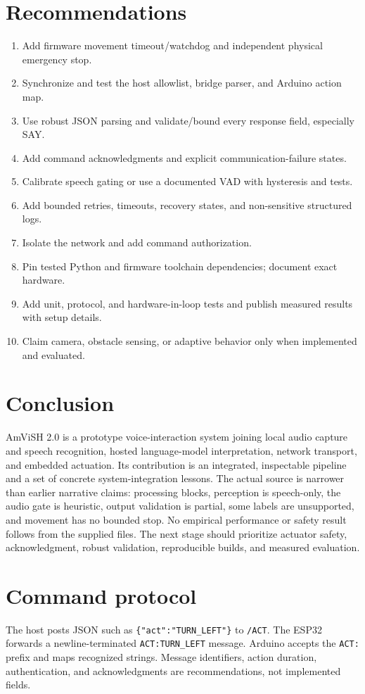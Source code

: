 \documentclass[12pt,a4paper]{report}
\begin{document}
\chapter{Recommendations}
\begin{enumerate}[leftmargin=*]\item Add firmware movement timeout/watchdog and independent physical emergency stop.\item Synchronize and test the host allowlist, bridge parser, and Arduino action map.\item Use robust JSON parsing and validate/bound every response field, especially SAY.\item Add command acknowledgments and explicit communication-failure states.\item Calibrate speech gating or use a documented VAD with hysteresis and tests.\item Add bounded retries, timeouts, recovery states, and non-sensitive structured logs.\item Isolate the network and add command authorization.\item Pin tested Python and firmware toolchain dependencies; document exact hardware.\item Add unit, protocol, and hardware-in-loop tests and publish measured results with setup details.\item Claim camera, obstacle sensing, or adaptive behavior only when implemented and evaluated.\end{enumerate}
\chapter{Conclusion}
AmViSH 2.0 is a prototype voice-interaction system joining local audio capture and speech recognition, hosted language-model interpretation, network transport, and embedded actuation. Its contribution is an integrated, inspectable pipeline and a set of concrete system-integration lessons. The actual source is narrower than earlier narrative claims: processing blocks, perception is speech-only, the audio gate is heuristic, output validation is partial, some labels are unsupported, and movement has no bounded stop. No empirical performance or safety result follows from the supplied files. The next stage should prioritize actuator safety, acknowledgment, robust validation, reproducible builds, and measured evaluation.
\appendix\chapter{Command protocol}
The host posts JSON such as \texttt{\{"act":"TURN\_LEFT"\}} to \texttt{/ACT}. The ESP32 forwards a newline-terminated \texttt{ACT:TURN\_LEFT} message. Arduino accepts the \texttt{ACT:} prefix and maps recognized strings. Message identifiers, action duration, authentication, and acknowledgments are recommendations, not implemented fields.
\end{document}
